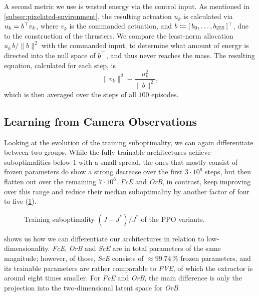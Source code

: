 A second metric we use is wasted energy via the control input. As mentioned in \cref{subsec:pixelated-environment}, the resulting actuation $u_k$
is calculated via $u_k = b^{\top} v_k$, where $v_k$ is the commanded actuation, and $b \coloneqq [\,b_0, \dots, b_{255}\,]^{\top}$, due to
the construction of the thrusters. We compare the least-norm allocation $u_k\, b/\lVert b\rVert^2$ with the commanded input, to determine what
amount of energy is directed into the null space of $b^{\top}$, and thus never reaches the mass. The resulting equation, calculated for each step, is
\begin{equation}
  \label{eq:null-waste}
  \lVert v_k\rVert^2 - \frac{u_k^2}{\lVert b\rVert^2},
\end{equation}
which is then averaged over the steps of all $100$ episodes.

\subsection{Learning from Camera Observations}
\label{subsec:visual-inputs-results}

Looking at the evolution of the training suboptimality, we can again differentiate between two groups. While the
fully trainable architectures achieve suboptimalities below $1$ with a small spread, the ones that mostly consist
of frozen parameters do show a strong decrease over the first $3 \cdot 10^{6}$ steps, but then flatten out over the remaining $7 \cdot 10^{6}$.
\emph{FcE} and \emph{OrB}, in contrast, keep improving over this range and reduce their median suboptimality by another factor of four to five
(\cref{fig:perc-curves}).

\begin{figure}[htbp]
  \centering
  \caption{Training suboptimality $(J - J^{*})/J^{*}$ of the PPO variants.}
  \label{fig:perc-curves}
\end{figure}

 shows us how we can differentiate our architectures in relation to low-dimensionality.
\emph{FcE}, \emph{OrB} and \emph{ScE} are in total parameters of the same magnitude; however, of those, \emph{ScE} consists of $\approx 99.74\,\%$ frozen
parameters, and its trainable parameters are rather comparable to \emph{PVE}, of which the extractor is around eight times smaller.
For \emph{FcE} and \emph{OrB}, the main difference is only the projection into the two-dimensional latent space for \emph{OrB}.

